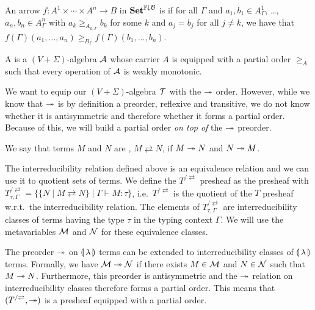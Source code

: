 \begin{definition}
  An arrow $f : A^1 \times \cdots \times A^n \to B$ in $\mathbf{Set}^{\mathbb{F}\downarrow\mathcal{B}}$ is
   if for all $\Gamma$ and
  $a_1, b_1 \in A^1_\Gamma$, \ldots, $a_n, b_n \in A^n_\Gamma$ with
  $a_k \ge_{A_{k,\Gamma}} b_k$ for some $k$ and $a_j = b_j$ for all
  $j \neq k$, we have that
  $f(\Gamma)(a_1, \ldots, a_n) \ge_{B_\Gamma} f(\Gamma)(b_1, \ldots,
  b_n)$.
\end{definition}

\begin{definition}
  A  is a $(V+\Sigma)$-algebra
  $\mathcal{A}$ whose carrier $A$ is equipped with a partial order $\ge_A$ such
  that every operation of $\mathcal{A}$ is weakly monotonic.
\end{definition}

We want to equip our $(V+\Sigma)$-algebra $\mathcal{T}$ with the $\twoheadrightarrow$
order. However, while we know that $\twoheadrightarrow$ is by definition a preorder,
reflexive and transitive, we do not know whether it is antisymmetric and
therefore whether it forms a partial order. Because of this, we will build
a partial order \emph{on top of} the $\twoheadrightarrow$ preorder.

\begin{definition}
  We say that terms $M$ and $N$ are ,
  $M \rightleftarrows N$, if $M \twoheadrightarrow N$ and $N \twoheadrightarrow M$.
\end{definition}

The interreducibility relation defined above is an equivalence relation and
we can use it to quotient sets of terms. We define the
$T^{/\rightleftarrows}$ presheaf as the presheaf with
$T^{/\rightleftarrows}_{\tau,\Gamma} = \{ \{ N \mid M \rightleftarrows N \}
\mid \Gamma \vdash M : \tau \}$, i.e.\ $T^{/\rightleftarrows}$ is the
quotient of the $T$ presheaf w.r.t.\ the interreducibility relation. The
elements of $T^{/\rightleftarrows}_{\tau,\Gamma}$ are interreducibility
classes of terms having the type $\tau$ in the typing context $\Gamma$. We
will use the metavariables $\mathcal{M}$ and $\mathcal{N}$ for these equivalence classes.

The preorder $\twoheadrightarrow$ on ${\llparenthesis \, \lambda \, \rrparenthesis}$ terms can be extended to interreducibility
classes of ${\llparenthesis \, \lambda \, \rrparenthesis}$ terms. Formally, we have $\mathcal{M} \twoheadrightarrow \mathcal{N}$ if there
exists $M \in \mathcal{M}$ and $N \in \mathcal{N}$ such that $M \twoheadrightarrow N$. Furthermore,
this preorder is antisymmetric and the $\twoheadrightarrow$ relation on interreducibility
classes therefore forms a partial order. This means that
$(T^{/\rightleftarrows}, \twoheadrightarrow)$ is a presheaf equipped with a partial
order.

